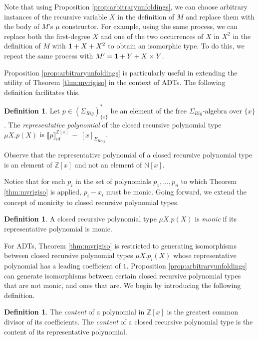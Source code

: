 \documentclass{msthesis}
\theoremstyle{definition}
\newtheorem{definition}[theorem]{Definition}
\newcommand{\semof}[1]{\llbracket{#1}\rrbracket}
\newcommand{\ints}{\mathbb{Z}}
\newcommand{\nat}{\mathbb{N}}
\begin{document}
Note that using Proposition \ref{prop:arbitraryunfoldings}, we can choose arbitrary instances of the recursive variable $X$ in the definition of $M$ and replace them with the body of $M$'s $\mu$ constructor.  For example, using the same process, we can replace both the first-degree $X$ and one of the two occurrences of $X$ in $X^2$ in the definition of $M$ with $\mathbf{1} + X + X^2$ to obtain an isomorphic type.  To do this, we repeat the same process with $M' = \mathbf{1} + Y + X \times Y$.

Proposition \ref{prop:arbitraryunfoldings} is particularly useful in extending the utility of Theorem \ref{thm:mvrigiso} in the context of ADTs.  The following definition facilitates this.

\begin{definition}
    Let $p \in (\Sigma_{Rig})^*_{\{x\}}$ be an element of the free $\Sigma_{Rig}$-algebra over $\{x\}$.  The \emph{representative polynomial} of the closed recursive polynomial type $\mu X.p(X)$ is $\semof{p}_{id}^{\ints[x]}~-~[x]_{E_{Ring}}$.
\end{definition}

Observe that the representative polynomial of a closed recursive polynomial type is an element of $\ints[x]$ and not an element of $\nat[x]$.

Notice that for each $p_i$ in the set of polynomials $p_1, ..., p_n$ to which Theorem \ref{thm:mvrigiso} is applied, $p_i - x_i$ must be monic.  Going forward, we extend the concept of monicity to closed recursive polynomial types.

\begin{definition}
    A closed recursive polynomial type $\mu X.p(X)$ is \emph{monic} if its representative polynomial is monic.
\end{definition}

For ADTs, Theorem \ref{thm:mvrigiso} is restricted to generating isomorphisms between closed recursive polynomial types $\mu X.p_i(X)$ whose representative polynomial has a leading coefficient of $1$.  Proposition \ref{prop:arbitraryunfoldings} can generate isomorphisms between certain closed recursive polynomial types that are not monic, and ones that are.  We begin by introducing the following definition.

\begin{definition}
    The \emph{content} of a polynomial in $\ints[x]$ is the greatest common divisor of its coefficients.  The \emph{content} of a closed recursive polynomial type is the content of its representative polynomial.
\end{definition}
\end{document}
